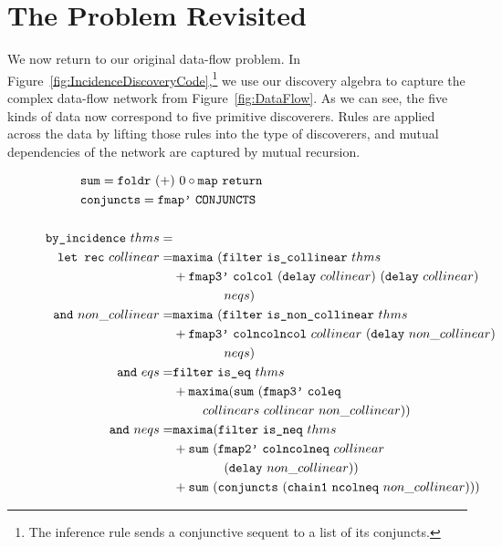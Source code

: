 \section{The Problem Revisited}\label{sec:Solution}
We now return to our original data-flow problem. In Figure~\ref{fig:IncidenceDiscoveryCode},\footnote{The inference rule  sends a conjunctive sequent to a list of its conjuncts.} we use our discovery algebra to capture the complex data-flow network from Figure~\ref{fig:DataFlow}. As we can see, the five kinds of data now correspond to five primitive discoverers. Rules are applied across the data by lifting those rules into the type of discoverers, and mutual dependencies of the network are captured by mutual recursion.
\begin{figure}
\begin{align*}
&\hspace{-2.55cm}\code{sum} = \code{foldr}\ (+)\  0\circ \code{map}\ \code{return}\\
&\hspace{-2.55cm}\code{conjuncts} = \code{fmap'}\ \code{CONJUNCTS}\\\\
\code{by\_incidence}\ thms = \\
\quad \code{let rec}\ collinear =& \code{maxima}\ (\code{filter}\ \code{is\_collinear}\ thms\\
& + \code{fmap3'}\ \code{colcol}\ (\code{delay}\ collinear)\ (\code{delay}\ collinear)\\
&\qquad\qquad neqs)\\
\code{and}\ non\_collinear =& \code{maxima}\ (\code{filter}\ \code{is\_non\_collinear}\ thms\\
&+ \code{fmap3'}\ \code{colncolncol}\ collinear\ (\code{delay}\ non\_collinear)\\
&\qquad\qquad neqs)\\
\code{and}\ eqs =& \code{filter}\ \code{is\_eq}\ thms\\
&+ \code{maxima} (\code{sum}\ (\code{fmap3'}\ \code{coleq}\\
&\qquad\ collinears\ collinear\ non\_collinear))\\
\code{and}\ neqs =& \code{maxima} (\code{filter}\ \code{is\_neq}\ thms\\
&+ \code{sum}\ (\code{fmap2'}\ \code{colncolneq}\ collinear\\
&\qquad\qquad (\code{delay}\ non\_collinear))\\
&+ \code{sum}\ (\code{conjuncts}\ (\code{chain1}\ \code{ncolneq}\ non\_collinear)))\\

\end{align*}
\end{figure}
